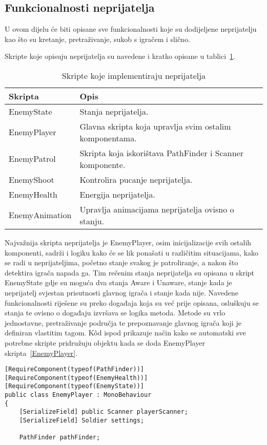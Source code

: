 \subsection{Funkcionalnosti neprijatelja}
U ovom dijelu će biti opisane sve funkcionalnosti koje su dodijeljene neprijatelju kao što su kretanje, pretraživanje, sukob s igračem i slično.

Skripte koje opisuju neprijatelja su navedene i kratko opisane u tablici~\ref{fig:EnemyTable}.
\begin{table}
\begin{tabularx}{0.9\textwidth}{lX}
\hline
Skripta&Opis \\
\hline
EnemyState&Stanja neprijatelja. \\
EnemyPlayer&Glavna skripta koja upravlja svim ostalim komponentama.\\
EnemyPatrol&Skripta koja iskorištava PathFinder i Scanner komponente.\\
EnemyShoot&Kontrolira pucanje neprijatelja. \\
EnemyHealth&Energija neprijatelja. \\
EnemyAnimation&Upravlja animacijama neprijatelja ovisno o stanju. \\
\hline
\end{tabularx}
\caption{Skripte koje implementiraju neprijatelja}\label{fig:EnemyTable}
\end{table}
Najvažnija skripta neprijatelja je EnemyPlayer, osim inicijalizacije svih ostalih komponenti, sadrži i logiku kako će se lik ponašati u različitim situacijama, kako se radi u neprijateljima, početno stanje svakog je patroliranje, a nakon što detektira igrača napada ga. Tim rečenim stanja neprijatelja su opisana u skript EnemyState gdje su moguća dva stanja Aware i Unaware, stanje kada je neprijatelj svjestan prisutnosti glavnog igrača i stanje kada nije. Navedene funkcionalnosti riješene su preko događaja koja su već prije opisana, osluškuju se stanja te ovisno o događaju izvršava se logika metoda. Metode su vrlo jednostavne, pretraživanje područja te prepoznavanje glavnog igrača koji je definiran vlastitim tagom. K\^od ispod prikazuje način kako se automatski sve potrebne skripte pridružuju objektu kada se doda EnemyPlayer skripta~\ref{EnemyPlayer}.
\begin{lstlisting}[caption={Automatsko pridruživanje ovisnih skripti}, label=EnemyPlayer]
[RequireComponent(typeof(PathFinder))]
[RequireComponent(typeof(EnemyHealth))]
[RequireComponent(typeof(EnemyState))]
public class EnemyPlayer : MonoBehaviour
{
    [SerializeField] public Scanner playerScanner;
    [SerializeField] Soldier settings;

    PathFinder pathFinder;
\end{lstlisting}
